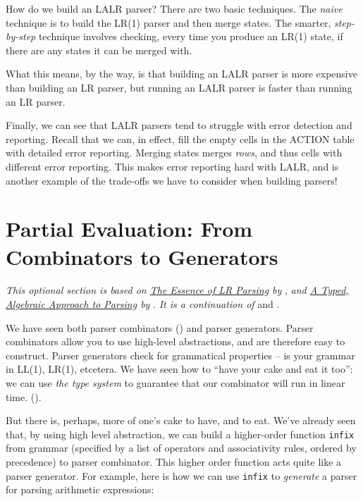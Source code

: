 How do we build an LALR parser? There are two basic techniques. The \textit{naive} technique is to build the LR(1) parser and then merge states. The smarter, \textit{step-by-step} technique involves checking, every time you produce an LR(1) state, if there are any states it can be merged with. 

What this means, by the way, is that building an LALR parser is more expensive than building an LR parser, but running an LALR parser is faster than running an LR parser.

Finally, we can see that LALR parsers tend to struggle with error detection and reporting. Recall that we can, in effect, fill the empty cells in the ACTION table with detailed error reporting. Merging states merges \textit{rows}, and thus cells with different error reporting. This makes error reporting hard with LALR, and is another example of the trade-offs we have to consider when building parsers!

\section{Partial Evaluation: From Combinators to Generators\optional}\label{section:partial-evaluation}
\textit{This optional section is based on \href{https://dl.acm.org/doi/pdf/10.1145/215465.215579}{The Essence of LR Parsing} by} \citet{sperber-1995}, \textit{and \href{https://www.cl.cam.ac.uk/~jdy22/papers/a-typed-algebraic-approach-to-parsing.pdf}{A Typed, Algebraic Approach to Parsing} by} \citet{krishnaswami-2019}. \textit{It is a continuation of}  and .

We have seen both parser combinators () and parser generators. Parser combinators allow you to use high-level abstractions, and are therefore easy to construct. Parser generators check for grammatical properties -- is your grammar in LL(1), LR(1), etcetera. We have seen how to ``have your cake and eat it too'': we can use \textit{the type system} to guarantee that our combinator will run in linear time. (). 

But there is, perhaps, more of one's cake to have, and to eat. We've already seen that, by using high level abstraction, we can build a higher-order function \texttt{infix} from grammar (specified by a list of operators and associativity rules, ordered by precedence) to parser combinator. This higher order function acts quite like a parser generator. For example, here is how we can use \texttt{infix} to \textit{generate} a parser for parsing arithmetic expressions:


